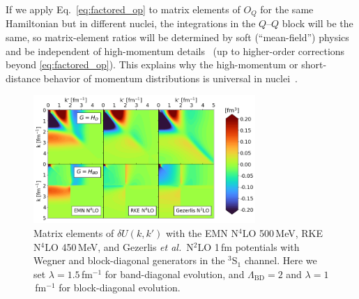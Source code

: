 \documentclass[10pt,aps,prc,floatfix,twocolumn,nofootinbib]{revtex4-1}
\newcommand{\LambdaBD}{{\Lambda_{\text{BD}}}}
\newcommand{\QQ}{\ensuremath{Q\mbox{--}Q}}
\begin{document}
If we apply Eq.~\eqref{eq:factored_op} to matrix elements of $O_Q$ for the same Hamiltonian but in different nuclei, the integrations in the $\QQ$ block will be the same, so matrix-element ratios will be determined by soft (``mean-field'') physics and be independent of high-momentum details~\cite{Anderson:2010aq} (up to higher-order corrections beyond \eqref{eq:factored_op}). 
This explains why the high-momentum or short-distance behavior of momentum distributions is universal in nuclei~\cite{Anderson:2010aq,Bogner:2012zm,Neff:2015xda,Cruz-Torres:2019fum}.


%
\begin{figure}[tbh]
	\includegraphics[clip,width=0.75\textwidth]{unitary_transformation_contours_kvnns_79_111_222_lamb1,5_Lamb2,0.png}%
	\caption{Matrix elements of $\delta U(k,k')$ with the EMN N$^4$LO 500\,MeV, RKE N$^4$LO 450\,MeV, and Gezerlis \textit{et al.}~N$^2$LO 1\,fm potentials with Wegner and block-diagonal generators in the $^3$S$_1$ channel. Here we set $\lambda=1.5$\,fm$^{-1}$ for band-diagonal evolution, and $\LambdaBD=2$ and $\lambda=1$\,fm$^{-1}$ for block-diagonal evolution.}
	\label{fig:delta_U_default_potentials}
\end{figure}
\end{document}
